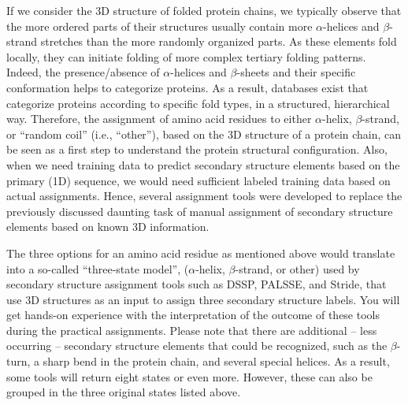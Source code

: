 If we consider the 3D structure of folded protein chains, we typically observe that the more ordered parts of their structures usually contain more $\alpha$-helices and $\beta$-strand stretches than the more randomly organized parts.
As these elements fold locally, they can initiate folding of more complex tertiary folding patterns. Indeed, the presence/absence of $\alpha$-helices and $\beta$-sheets and their specific conformation helps to categorize proteins.
As a result, databases exist that categorize proteins according to specific fold types, in a structured, hierarchical way.
Therefore, the assignment of amino acid residues to either $\alpha$-helix, $\beta$-strand, or ``random coil'' (i.e., ``other''), based on the 3D structure of a protein chain, can be seen as a first step to understand the protein structural configuration.
Also, when we need training data to predict secondary structure elements based on the primary (1D) sequence, we would need sufficient labeled training data based on actual assignments.
Hence, several assignment tools were developed to replace the previously discussed daunting task of manual assignment of secondary structure elements based on known 3D information.

The three options for an amino acid residue as mentioned above would translate into a so-called ``three-state model'', ($\alpha$-helix, $\beta$-strand, or other) used by secondary structure assignment tools such as DSSP, PALSSE, and Stride, that use 3D structures as an input to assign three secondary structure labels.
You will get hands-on experience with the interpretation of the outcome of these tools during the practical assignments. Please note that there are additional -- less occurring -- secondary structure elements that could be recognized, such as the $\beta$-turn, a sharp bend in the protein chain, and several special helices.
As a result, some tools will return eight states or even more. However, these can also be grouped in the three original states listed above.

